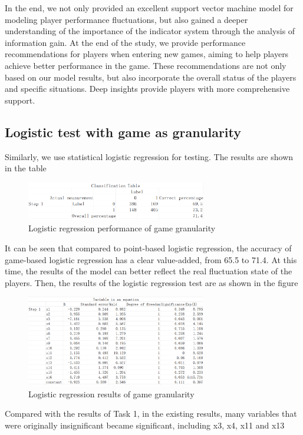 \documentclass{article}
\begin{document}
In the end, we not only provided an excellent support vector machine model for modeling player performance fluctuations, but also gained a deeper understanding of the importance of the indicator system through the analysis of information gain. At the end of the study,
we provide performance recommendations for players when entering new games, aiming to help players achieve better performance in the game. These recommendations are not only based on our model results, but also incorporate the overall status of the players and specific
situations. Deep insights provide players with more comprehensive support.

\subsection{Logistic test with game as granularity}
Similarly, we use statistical logistic regression for testing. The results are shown in the table
\begin{figure}[H]
      \centering
      \includegraphics[width=0.7\textwidth]{logisitc_classification2.png}
      \caption{Logistic regression performance of game granularity}
\end{figure}
It can be seen that compared to point-based logistic regression, the accuracy of game-based logistic regression has a clear value-added,
from 65.5 to 71.4. At this time, the results of the model can better reflect the real fluctuation state of the players. Then, the results of the logistic
regression test are as shown in the figure
\begin{figure}[H]
      \centering
      \includegraphics[width=0.7\textwidth]{logistic_eq2.png}
      \caption{Logistic regression results of game granularity}
\end{figure}
Compared with the results of Task 1, in the existing results, many variables that were originally insignificant became significant, including x3, x4, x11 and x13
\end{document}
